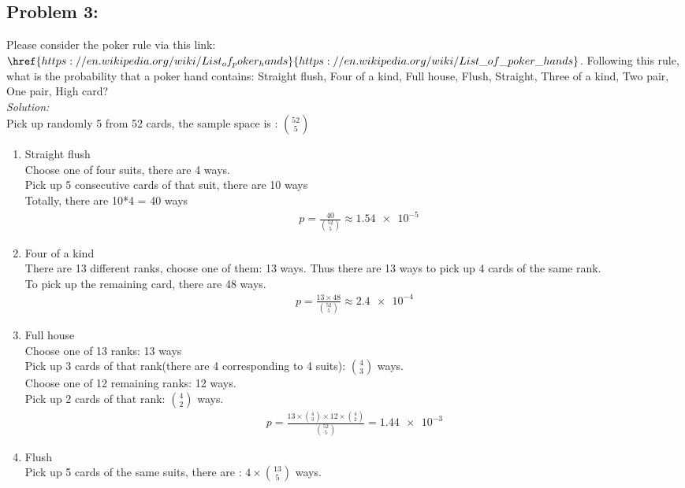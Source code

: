 \documentclass[a4paper]{article}
\begin{document}
	\subsection*{Problem 3:}
	Please consider the poker rule via this link: $\href{https://en.wikipedia.org/wiki/List_of_poker_hands}{https://en.wikipedia.org/wiki/List\_of\_poker\_hands}$. Following this rule, what is the probability that a poker hand contains: Straight flush, Four of a kind, Full house, Flush, Straight, Three of a kind, Two pair, One pair, High card? \\
	\textit{Solution:}\\
	Pick up randomly 5 from 52 cards, the sample space is :  ${52 \choose 5}$
	\begin{enumerate}
		\item Straight flush\\
		Choose one of four suits, there are 4 ways. \\
		Pick up 5 consecutive cards of that suit, there are 10 ways \\
		Totally, there are 10*4 = 40 ways
		\begin{align*}
		&p = \frac{40}{{52\choose 5}} \approx \num{1.54e-5} 
		\end{align*}
		\item Four of a kind \\
		There are 13 different ranks, choose one of them: 13 ways.
		Thus there are 13 ways to pick up 4 cards of the same rank. \\
		To pick up the remaining card, there are 48 ways.
		\begin{align*}
		p = \frac{13\times48}{{52\choose 5}} \approx \num{2.4e-4}
		\end{align*}
		\item Full house \\
		Choose one of 13 ranks: 13 ways \\
		Pick up 3 cards of that rank(there are 4 corresponding to 4 suits): ${4 \choose 3}$ ways. \\
		Choose one of 12 remaining ranks: 12 ways. \\
		Pick up 2 cards of that rank: ${4\choose 2}$ ways. \\
		\begin{align*}
		p = \frac{13 \times {4\choose 3} \times 12 \times {4 \choose 2}}{{52 \choose 5}} = \num{1.44e-3} 
		\end{align*}
		\item Flush \\
		Pick up 5 cards of the same suits, there are : $4 \times{13\choose 5}$ ways. \\

\end{enumerate}
\end{document}
